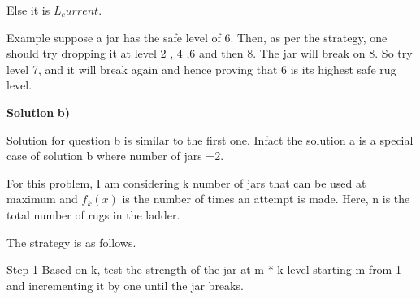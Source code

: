 \documentclass[letterpaper,portrait,12pt]{article}
\begin{document}
\begin{flushleft}
		Else it is $L_current$.
\end{flushleft}


\begin{flushleft}

\end{flushleft}


\begin{flushleft}
Example suppose a jar has the safe level of 6. Then, as per the strategy, one should try dropping it at level 2 , 4 ,6 and then 8. The jar will break on 8. So try level 7, and it will break again and hence proving that 6 is its highest safe rug level.
\end{flushleft}


\begin{flushleft}

\end{flushleft}


\begin{flushleft}
\textbf{Solution }\textbf{b}\textbf{)}
\end{flushleft}


\begin{flushleft}
	Solution for question b is similar to the first one. Infact the solution a is a special case of solution b where number of jars =2.
\end{flushleft}


\begin{flushleft}
For this problem, I am considering k number of jars that can be used at maximum and $f_k(x)$ is the number of times an attempt is made. Here, n is the total number of rugs in the ladder.
\end{flushleft}


\begin{flushleft}

\end{flushleft}


\begin{flushleft}

\end{flushleft}


\begin{flushleft}
The strategy is as follows.
\end{flushleft}


\begin{flushleft}

\end{flushleft}


\begin{flushleft}
Step-1 Based on k, test the strength of the jar at m * k level starting m from 1 and incrementing it by one until the jar breaks.
\end{flushleft}
\end{document}
